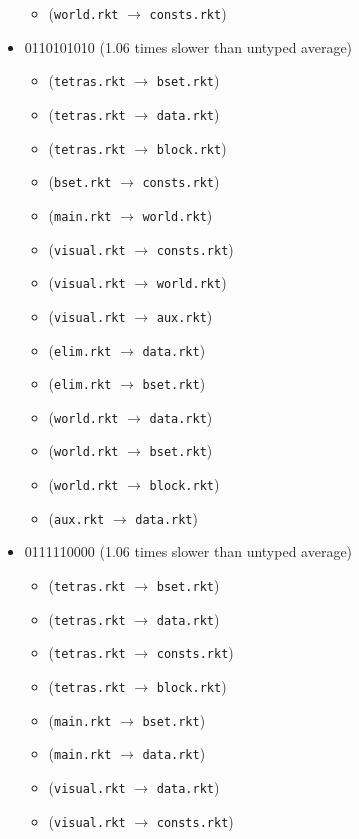 \documentclass{article}
\newcommand{\mono}[1]{\texttt{#1}}
\begin{document}
\begin{itemize}
\begin{itemize}
  \item (\mono{world.rkt} $\rightarrow$ \mono{consts.rkt})
  \end{itemize}
\item 0110101010 (1.06 times slower than untyped average)
  \begin{itemize}
  \item (\mono{tetras.rkt} $\rightarrow$ \mono{bset.rkt})
  \item (\mono{tetras.rkt} $\rightarrow$ \mono{data.rkt})
  \item (\mono{tetras.rkt} $\rightarrow$ \mono{block.rkt})
  \item (\mono{bset.rkt} $\rightarrow$ \mono{consts.rkt})
  \item (\mono{main.rkt} $\rightarrow$ \mono{world.rkt})
  \item (\mono{visual.rkt} $\rightarrow$ \mono{consts.rkt})
  \item (\mono{visual.rkt} $\rightarrow$ \mono{world.rkt})
  \item (\mono{visual.rkt} $\rightarrow$ \mono{aux.rkt})
  \item (\mono{elim.rkt} $\rightarrow$ \mono{data.rkt})
  \item (\mono{elim.rkt} $\rightarrow$ \mono{bset.rkt})
  \item (\mono{world.rkt} $\rightarrow$ \mono{data.rkt})
  \item (\mono{world.rkt} $\rightarrow$ \mono{bset.rkt})
  \item (\mono{world.rkt} $\rightarrow$ \mono{block.rkt})
  \item (\mono{aux.rkt} $\rightarrow$ \mono{data.rkt})
  \end{itemize}
\item 0111110000 (1.06 times slower than untyped average)
  \begin{itemize}
  \item (\mono{tetras.rkt} $\rightarrow$ \mono{bset.rkt})
  \item (\mono{tetras.rkt} $\rightarrow$ \mono{data.rkt})
  \item (\mono{tetras.rkt} $\rightarrow$ \mono{consts.rkt})
  \item (\mono{tetras.rkt} $\rightarrow$ \mono{block.rkt})
  \item (\mono{main.rkt} $\rightarrow$ \mono{bset.rkt})
  \item (\mono{main.rkt} $\rightarrow$ \mono{data.rkt})
  \item (\mono{visual.rkt} $\rightarrow$ \mono{data.rkt})
  \item (\mono{visual.rkt} $\rightarrow$ \mono{consts.rkt})

\end{itemize}
\end{itemize}
\end{document}
